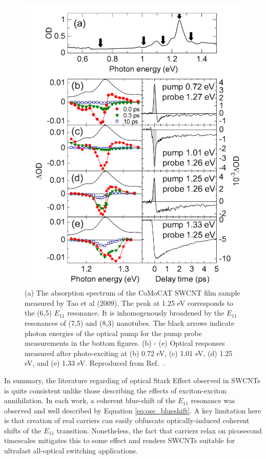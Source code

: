 \begin{figure}[ht]
	\centering
	\includegraphics[scale=0.25]{images/chapter_prior_works/abs_dtt_tao_2009}
	\caption{(a) The absorption spectrum of the CoMoCAT SWCNT film sample measured by Tao et al (2009). The peak at 1.25 eV corresponds to the (6,5) $E_{11}$ resonance. It is inhomogenously broadened by the $E_{11}$ resonances of (7,5) and (8,3) nanotubes. The black arrows indicate photon energies of the optical pump for the pump probe measurements in the bottom figures. (b) - (e) Optical responses measured after photo-exciting at (b) 0.72 eV, (c) 1.01 eV, (d) 1.25 eV, and (e) 1.33 eV.  Reproduced from Ref.\ \cite{tao2009subpicosecond}.}
	\label{fig:abs_dtt_tao_2009}
\end{figure}

In summary, the literature regarding of optical Stark Effect observed in SWCNTs is quite consistent unlike those describing the effects of exciton-exciton annihilation. In each work, a coherent blue-shift of the $E_{11}$ resonance was observed and well described by Equation \eqref{eq:ose_blueshift}. A key limitation here is that creation of real carriers can easily obfuscate optically-induced coherent shifts of the $E_{11}$ transition. Nonetheless, the fact that carriers relax on picosecond timescales mitigates this to some effect and renders SWCNTs suitable for ultrafast all-optical switching applications.



